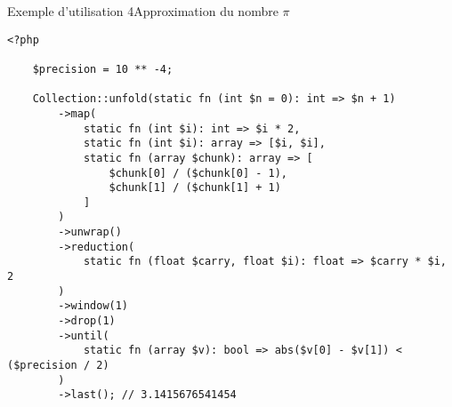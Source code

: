 \begin{frame}[fragile]{Exemple d'utilisation 4}{Approximation du nombre $\pi$}
    \begin{lstlisting}[firstnumber=1]
    <?php

    $precision = 10 ** -4;

    Collection::unfold(static fn (int $n = 0): int => $n + 1)
        ->map(
            static fn (int $i): int => $i * 2,
            static fn (int $i): array => [$i, $i],
            static fn (array $chunk): array => [
                $chunk[0] / ($chunk[0] - 1),
                $chunk[1] / ($chunk[1] + 1)
            ]
        )
        ->unwrap()
        ->reduction(
            static fn (float $carry, float $i): float => $carry * $i, 2
        )
        ->window(1)
        ->drop(1)
        ->until(
            static fn (array $v): bool => abs($v[0] - $v[1]) < ($precision / 2)
        )
        ->last(); // 3.1415676541454
    \end{lstlisting}
\end{frame}


